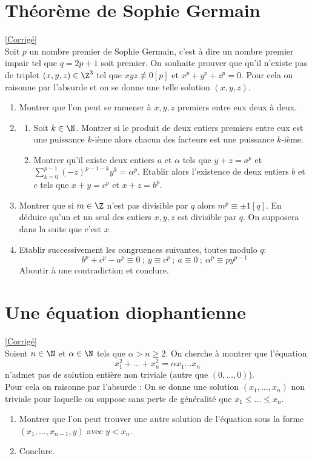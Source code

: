 \documentclass[8pt]{book}
\begin{document}
\section{Théorème de Sophie Germain }
\label{Théorème de Sophie Germain}
\textcolor{blue}{\hyperref[Théorème de Sophie Germain corrigé]{[Corrigé]}}\\
Soit $p$ un nombre premier de Sophie Germain, c'est à dire un nombre premier impair tel que $q=2p+1$ soit premier. On souhaite prouver que qu'il n'existe pas de triplet $(x,y,z)\in \Z^3$ tel que $xyz\not\equiv 0[p]$ et $x^p+y^p+z^p=0$. Pour cela on raisonne par l'absurde et on se donne une telle solution $(x,y,z)$.
\begin{enumerate}
	\item Montrer que l'on peut se ramener à $x,y,z$ premiers entre eux deux à deux.
	\item
	\begin{enumerate}[label=\alph*.]
		\item Soit $k\in \N$. Montrer si le produit de deux entiers premiers entre eux est une puissance $k$-ième alors chacun des facteurs est une puissance $k$-ième.
		\item Montrer qu'il existe deux entiers $a$ et $\alpha$ tels que $y+z=a^p$ et $\displaystyle\sum_{k=0}^{p-1}(-z)^{p-1-k}y^k=\alpha^p$. Etablir alors l'existence de deux entiers $b$ et $c$ tels que $x+y=c^p$ et $x+z=b^p$.
	\end{enumerate}
	\item Montrer que si $m\in \Z$ n'est pas divisible par $q$ alors $m^p\equiv \pm1[q]$. En déduire qu'un et un seul des entiers $x,y,z$ est divisible par $q$. On supposera dans la suite que c'est $x$.
	\item Etablir successivement les congruences suivantes, toutes modulo $q$:
	$$b^p+c^p-a^p\equiv 0\ ;\ y\equiv c^p\ ;\ a\equiv 0\ ;\ \alpha^p\equiv py^{p-1}$$
	Aboutir à une contradiction et conclure.
\end{enumerate}

\section{Une équation diophantienne }
\label{Une équation diophantienne}
\textcolor{blue}{\hyperref[Une équation diophantienne corrigé]{[Corrigé]}}\\
Soient $n\in \N$ et $\alpha \in \N$ tels que $\alpha >n\geq 2$. On cherche à montrer que l'équation
$$x_1^2+\dots+x_n^2=\alpha x_1\dots x_n$$
n'admet pas de solution entière non triviale (autre que $(0,\dots,0)$).\\
Pour cela on raisonne par l'absurde : On se donne une solution $(x_1,\dots,x_n)$ non triviale pour laquelle on suppose sans perte de généralité que $x_1\leq \dots \leq x_n$.
\begin{enumerate}
	\item Montrer que l'on peut trouver une autre solution de l'équation sous la forme $(x_1,\dots,x_{n-1},y)$ avec $y<x_n$.
	\item Conclure.
\end{enumerate}
\end{document}
